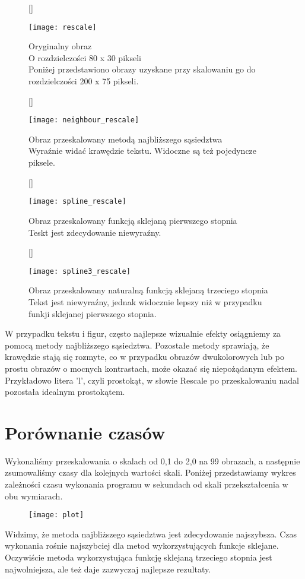 \documentclass{mwart}
\theoremstyle{definition}
\begin{document}
\begin{figure}[h!]
[\FBwidth]
{\caption*{Oryginalny obraz \\ O rozdzielczości 80 x 30 pikseli \\ Poniżej przedstawiono obrazy uzyskane przy skalowaniu go do rozdzielczości 200 x 75 pikseli.}\label{aa}}
{\texttt{[image: rescale]}}
\end{figure}

\begin{figure}[h!]
[\FBwidth]
{\caption*{Obraz przeskalowany metodą najbliższego sąsiedztwa \\ Wyraźnie widać krawędzie tekstu. Widoczne są też pojedyncze piksele. }\label{aa}}
{\texttt{[image: neighbour\_rescale]}}
\end{figure}

\begin{figure}[h!]
[\FBwidth]
{\caption*{Obraz przeskalowany funkcją sklejaną pierwszego stopnia \\ Teskt jest zdecydowanie niewyraźny.}\label{aa}}
{\texttt{[image: spline\_rescale]}}
\end{figure}

\begin{figure}[h!]
[\FBwidth]
{\caption*{Obraz przeskalowany naturalną funkcją sklejaną trzeciego stopnia \\ Tekst jest niewyraźny, jednak widocznie lepszy niż w przypadku funkji sklejanej pierwszego stopnia.}\label{aa}}
{\texttt{[image: spline3\_rescale]}}
\end{figure}
W przypadku tekstu i figur, często najlepsze wizualnie efekty osiągniemy za pomocą metody najbliższego sąsiedztwa. Pozostałe metody sprawiają, że krawędzie stają się rozmyte, co w przypadku obrazów dwukolorowych lub po prostu obrazów o mocnych kontrastach, może okazać się niepożądanym efektem. Przykładowo litera 'l', czyli prostokąt, w słowie Rescale po przeskalowaniu nadal pozostała idealnym prostokątem.

\clearpage
\section{Porównanie czasów}

Wykonaliśmy przeskalowania o skalach od 0,1 do 2,0 na 99 obrazach, a następnie zsumowaliśmy czasy dla kolejnych wartości skali. Poniżej przedstawiamy wykres zależności czasu wykonania programu w sekundach od skali przekształcenia w obu wymiarach. 
\begin{figure}[!h]
	\texttt{[image: plot]}
	\caption*{}
\end{figure}
Widzimy, że metoda najbliższego sąsiedztwa jest zdecydowanie najszybsza. Czas wykonania rośnie najszybciej dla metod wykorzystujących funkcje sklejane. Oczywiście metoda wykorzystująca funkcję sklejaną trzeciego stopnia jest najwolniejsza, ale też daje zazwyczaj najlepsze rezultaty.
\end{document}
